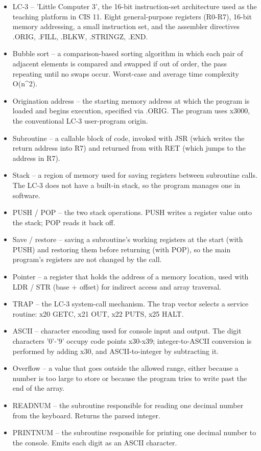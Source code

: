 \documentclass[11pt]{article}
\begin{document}
\begin{itemize}
  \item LC-3 -- 'Little Computer 3', the 16-bit instruction-set architecture used as the teaching platform in CIS 11. Eight general-purpose registers (R0-R7), 16-bit memory addressing, a small instruction set, and the assembler directives .ORIG, .FILL, .BLKW, .STRINGZ, .END.
  \item Bubble sort -- a comparison-based sorting algorithm in which each pair of adjacent elements is compared and swapped if out of order, the pass repeating until no swaps occur. Worst-case and average time complexity O(n\textasciicircum{}2).
  \item Origination address -- the starting memory address at which the program is loaded and begins execution, specified via .ORIG. The program uses x3000, the conventional LC-3 user-program origin.
  \item Subroutine -- a callable block of code, invoked with JSR (which writes the return address into R7) and returned from with RET (which jumps to the address in R7).
  \item Stack -- a region of memory used for saving registers between subroutine calls. The LC-3 does not have a built-in stack, so the program manages one in software.
  \item PUSH / POP -- the two stack operations. PUSH writes a register value onto the stack; POP reads it back off.
  \item Save / restore -- saving a subroutine's working registers at the start (with PUSH) and restoring them before returning (with POP), so the main program's registers are not changed by the call.
  \item Pointer -- a register that holds the address of a memory location, used with LDR / STR (base + offset) for indirect access and array traversal.
  \item TRAP -- the LC-3 system-call mechanism. The trap vector selects a service routine: x20 GETC, x21 OUT, x22 PUTS, x25 HALT.
  \item ASCII -- character encoding used for console input and output. The digit characters '0'-'9' occupy code points x30-x39; integer-to-ASCII conversion is performed by adding x30, and ASCII-to-integer by subtracting it.
  \item Overflow -- a value that goes outside the allowed range, either because a number is too large to store or because the program tries to write past the end of the array.
  \item READNUM -- the subroutine responsible for reading one decimal number from the keyboard. Returns the parsed integer.
  \item PRINTNUM -- the subroutine responsible for printing one decimal number to the console. Emits each digit as an ASCII character.
\end{itemize}
\end{document}
